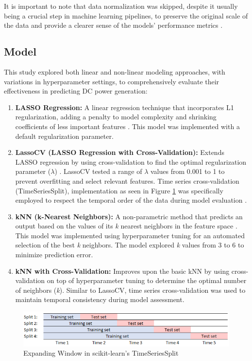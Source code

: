 It is important to note that data normalization was skipped, despite it usually being a crucial step in machine learning pipelines, to preserve the original scale of the data and provide a clearer sense of the models' performance metrics \citep{rs15123095}.

\subsection{Model}

This study explored both linear and non-linear modeling approaches, with variations in hyperparameter settings, to comprehensively evaluate their effectiveness in predicting DC power generation:

\begin{enumerate}
   \item \textbf{LASSO Regression:} A linear regression technique that incorporates L1 regularization, adding a penalty to model complexity and shrinking coefficients of less important features \citep{Elgamal1985}. This model was implemented with a default regularization parameter.
   \item \textbf{LassoCV (LASSO Regression with Cross-Validation):} Extends LASSO regression by using cross-validation to find the optimal regularization parameter (\(\lambda\)) \citep{Nordhausen_2009}.  LassoCV tested a range of  \(\lambda\) values from 0.001 to 1 to prevent overfitting and select relevant features. Time series cross-validation (TimeSeriesSplit), implementation as seen in Figure \ref{fig:time_series_split} was specifically employed to respect the temporal order of the data during model evaluation \citep{Hyndman_2017}.
   \item \textbf{kNN (k-Nearest Neighbors):} A non-parametric method that predicts an output based on the values of its \emph{k} nearest neighbors in the feature space \citep{Altman_1992}. This model was implemented using hyperparameter tuning for an automated selection of the best \emph{k} neighbors. The model explored \emph{k} values from 3 to 6 to minimize prediction error. 
   \item \textbf{kNN with Cross-Validation:} Improves upon the basic kNN by using cross-validation on top of hyperparameter tuning to determine the optimal number of neighbors (\emph{k}). Similar to LassoCV, time series cross-validation was used to maintain temporal consistency during model assessment. 
\end{enumerate} 

\begin{figure}[!htpb]
    \centering
    \includegraphics[width=\linewidth]{Figures/time_series_split.png}
    \caption{Expanding Window in scikit-learn's TimeSeriesSplit}
    \label{fig:time_series_split}
\end{figure}

